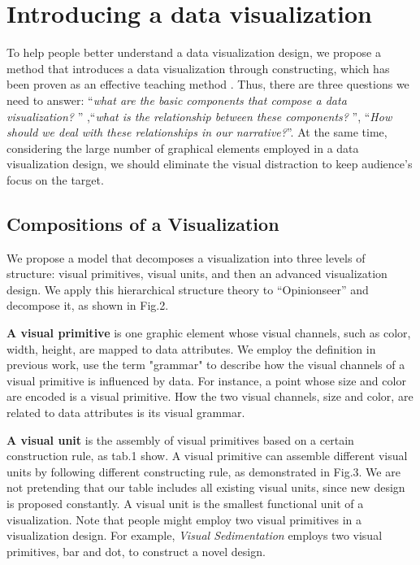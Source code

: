 \section{Introducing a data visualization} 
To help people better understand a data visualization design, we propose a method that introduces a data visualization through constructing, which has been proven as an effective teaching method\cite{huron_constructive_2014, chapman_constructive_1988} . Thus, there are three questions we need to answer: ``\textit{what are the basic components that compose a data visualization? }'' ,``\textit{what is the relationship between these components? }'', ``\textit{How should we deal with these relationships in our narrative?}''. At the same time, considering the large number of graphical elements employed in a data visualization design, we should eliminate the visual distraction to keep audience's focus on the target.

\subsection{Compositions of a Visualization}
We propose a model that decomposes a visualization into three levels of structure: visual primitives, visual units, and then an advanced visualization design. We apply this hierarchical structure theory to ``Opinionseer'' and decompose it, as shown in Fig.2. 

\textbf{A visual primitive} is one graphic element whose visual channels, such as color, width, height, are mapped to data attributes. We employ the definition in previous work\cite{huron_constructive_2014, satyanarayan_vega-lite:_2017}, use the term "grammar" to describe how the visual channels of a visual primitive is influenced by data. For instance, a point whose size and color are encoded is a visual primitive. How the two visual channels, size and color, are related to data attributes is its visual grammar. 

\textbf{A visual unit} is the assembly of visual primitives based on a certain construction rule, as tab.1 show. 
A visual primitive can assemble different visual units by following different constructing rule, as demonstrated in Fig.3. We are not pretending that our table includes all existing visual units, since new design is proposed constantly. A visual unit is the smallest functional unit of a visualization. Note that people might employ two visual primitives in a visualization design. For example, \textit{Visual Sedimentation}\cite{huron_visual_2013} employs two visual primitives, bar and dot, to construct a novel design. 


